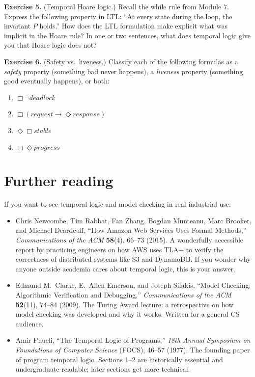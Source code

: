 \documentclass[11pt]{article}
\begin{document}
\bigskip
\textbf{Exercise 5.}\label{ex:temp:5} (Temporal Hoare logic.) Recall the while rule from Module 7. Express the following property in LTL: ``At every state during the loop, the invariant $P$ holds.'' How does the LTL formulation make explicit what was implicit in the Hoare rule? In one or two sentences, what does temporal logic give you that Hoare logic does not?

\bigskip
\textbf{Exercise 6.}\label{ex:temp:6} (Safety vs.\ liveness.) Classify each of the following formulas as a \emph{safety} property (something bad never happens), a \emph{liveness} property (something good eventually happens), or both:
\begin{enumerate}[label=(\alph*)]
  \item $\Box \lnot \mathit{deadlock}$
  \item $\Box (\mathit{request} \to \Diamond \mathit{response})$
  \item $\Diamond \Box \mathit{stable}$
  \item $\Box \Diamond \mathit{progress}$
\end{enumerate}

\section*{Further reading}

If you want to see temporal logic and model checking in real industrial use:

\begin{itemize}
  \item Chris Newcombe, Tim Rabbat, Fan Zhang, Bogdan Munteanu, Marc Brooker, and Michael Deardeuff, ``How Amazon Web Services Uses Formal Methods,'' \emph{Communications of the ACM} \textbf{58}(4), 66--73 (2015). A wonderfully accessible report by practicing engineers on how AWS uses TLA+ to verify the correctness of distributed systems like S3 and DynamoDB. If you wonder why anyone outside academia cares about temporal logic, this is your answer.
  \item Edmund M.\ Clarke, E.\ Allen Emerson, and Joseph Sifakis, ``Model Checking: Algorithmic Verification and Debugging,'' \emph{Communications of the ACM} \textbf{52}(11), 74--84 (2009). The Turing Award lecture: a retrospective on how model checking was developed and why it works. Written for a general CS audience.
  \item Amir Pnueli, ``The Temporal Logic of Programs,'' \emph{18th Annual Symposium on Foundations of Computer Science} (FOCS), 46--57 (1977). The founding paper of program temporal logic. Sections 1--2 are historically essential and undergraduate-readable; later sections get more technical.
\end{itemize}
\end{document}
